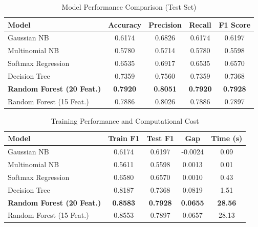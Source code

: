 \documentclass[11pt, a4paper]{article}
\begin{document}
\begin{table}[H]
    \centering
    \caption{Model Performance Comparison (Test Set)}
    \label{tab:model_performance}
    \begin{tabular}{lcccc}
        \toprule
        \textbf{Model} & \textbf{Accuracy} & \textbf{Precision} & \textbf{Recall} & \textbf{F1 Score} \\
        \midrule
        Gaussian NB & 0.6174 & 0.6826 & 0.6174 & 0.6197 \\
        Multinomial NB & 0.5780 & 0.5714 & 0.5780 & 0.5598 \\
        Softmax Regression & 0.6535 & 0.6917 & 0.6535 & 0.6570 \\
        Decision Tree & 0.7359 & 0.7560 & 0.7359 & 0.7368 \\
        \textbf{Random Forest (20 Feat.)} & \textbf{0.7920} & \textbf{0.8051} & \textbf{0.7920} & \textbf{0.7928} \\
        Random Forest (15 Feat.) & 0.7886 & 0.8026 & 0.7886 & 0.7897 \\
        \bottomrule
    \end{tabular}
\end{table}

\begin{table}[H]
    \centering
    \caption{Training Performance and Computational Cost}
    \label{tab:training_performance}
    \begin{tabular}{lcccc}
        \toprule
        \textbf{Model} & \textbf{Train F1} & \textbf{Test F1} & \textbf{Gap} & \textbf{Time (s)} \\
        \midrule
        Gaussian NB & 0.6174 & 0.6197 & -0.0024 & 0.09 \\
        Multinomial NB & 0.5611 & 0.5598 & 0.0013 & 0.01 \\
        Softmax Regression & 0.6580 & 0.6570 & 0.0010 & 0.43 \\
        Decision Tree & 0.8187 & 0.7368 & 0.0819 & 1.51 \\
        \textbf{Random Forest (20 Feat.)} & \textbf{0.8583} & \textbf{0.7928} & \textbf{0.0655} & \textbf{28.56} \\
        Random Forest (15 Feat.) & 0.8553 & 0.7897 & 0.0657 & 28.13 \\
        \bottomrule
    \end{tabular}
\end{table}
\end{document}

